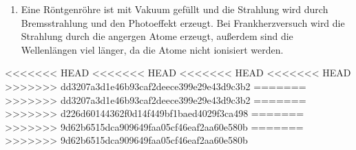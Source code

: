 \documentclass[11pt, a4paper]{article}
\begin{document}
\begin{enumerate}
        \item Eine Röntgenröhre ist mit Vakuum gefüllt und die Strahlung wird durch Bremsstrahlung und den Photoeffekt erzeugt. Bei Frankherzversuch wird die Strahlung durch die angergen Atome erzeugt, außerdem sind die Wellenlängen viel länger, da die Atome nicht ionisiert werden. 
        
        
    \end{enumerate}

        

<<<<<<< HEAD
<<<<<<< HEAD
<<<<<<< HEAD
<<<<<<< HEAD
>>>>>>> dd3207a3d1e46b93caf2deece399e29e43d9c3b2
=======
>>>>>>> dd3207a3d1e46b93caf2deece399e29e43d9c3b2
=======
>>>>>>> d226d60144362f0d14f449bf1baed4029f3ca498
=======
>>>>>>> 9d62b6515dca909649faa05cf46eaf2aa60e580b
=======
>>>>>>> 9d62b6515dca909649faa05cf46eaf2aa60e580b
    
    
\end{document}
